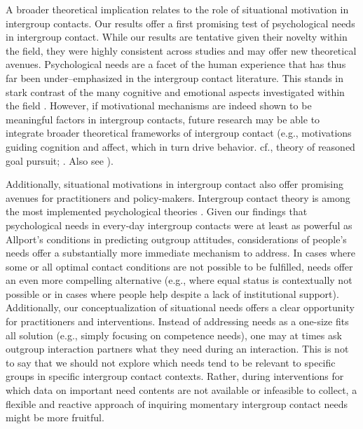 \documentclass[man, 12pt, a4paper, mask]{apa7}
\theoremstyle{break}
\theoremstyle{plain}
\begin{document}
A broader theoretical implication relates to the role of situational motivation in intergroup contacts. Our results offer a first promising test of psychological needs in intergroup contact. While our results are tentative given their novelty within the field, they were highly consistent across studies and may offer new theoretical avenues. Psychological needs are a facet of the human experience that has thus far been under–emphasized in the intergroup contact literature. This stands in stark contrast of the many cognitive \citep[e.g.,][]{Pettigrew1998, Brown2005} and emotional aspects investigated within the field \citep[e.g.,][]{Stephan2008, Paolini2004}. However, if motivational mechanisms are indeed shown to be meaningful factors in intergroup contacts, future research may be able to integrate broader theoretical frameworks of intergroup contact (e.g., motivations guiding cognition and affect, which in turn drive behavior. cf., theory of reasoned goal pursuit; \citealp{Ajzen2019}. Also see \citealp{Kreienkamp2022d}). 

Additionally, situational motivations in intergroup contact also offer promising avenues for practitioners and policy-makers. Intergroup contact theory is among the most implemented psychological theories \citep[e.g.,][]{Pettigrew2006, AlRamiah2012a, Reimer2021}. Given our findings that psychological needs in every-day intergroup contacts were at least as powerful as Allport's conditions in predicting outgroup attitudes, considerations of people's needs offer a substantially more immediate mechanism to address. In cases where some or all optimal contact conditions are not possible to be fulfilled, needs offer an even more compelling alternative (e.g., where equal status is contextually not possible or in cases where people help despite a lack of institutional support). Additionally, our conceptualization of situational needs offers a clear opportunity for practitioners and interventions. Instead of addressing needs as a one-size fits all solution (e.g., simply focusing on competence needs), one may at times ask outgroup interaction partners what they need during an interaction. This is not to say that we should not explore which needs tend to be relevant to specific groups in specific intergroup contact contexts. Rather, during interventions for which data on important need contents are not available or infeasible to collect, a flexible and reactive approach of inquiring momentary intergroup contact needs might be more fruitful.
\end{document}
